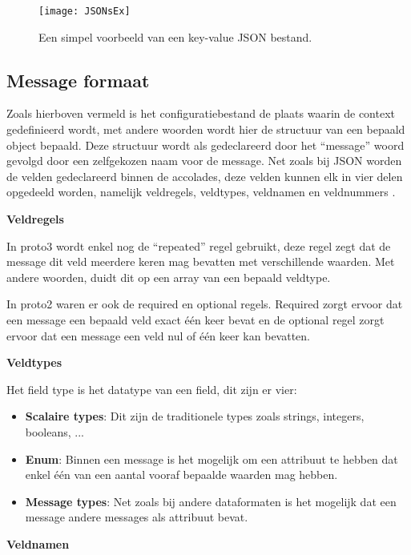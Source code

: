 \begin{figure}[H]
    \centering
    \texttt{[image: JSONsEx]}
    \caption[Simpel JSON key-value voorbeeld]{Een simpel voorbeeld van een key-value JSON bestand. \autocite{Kurian2020}}
    \label{fig:JSONsEx}
\end{figure}


\subsection{Message formaat}
\label{subsec:Message formaat}

Zoals hierboven vermeld is het configuratiebestand de plaats waarin de context gedefinieerd wordt, met andere woorden wordt hier de structuur van een bepaald object bepaald. Deze structuur wordt als gedeclareerd door het “message” woord gevolgd door een zelfgekozen naam voor de message. Net zoals bij JSON worden de velden gedeclareerd binnen de accolades, deze velden kunnen elk in vier delen opgedeeld worden, namelijk veldregels, veldtypes, veldnamen en veldnummers \autocite{Google2020}.

\textbf{Veldregels}

In proto3 wordt enkel nog de “repeated” regel gebruikt, deze regel zegt dat de message dit veld meerdere keren mag bevatten met verschillende waarden. Met andere woorden, duidt dit op een array van een bepaald veldtype.

In proto2 waren er ook de required en optional regels. Required zorgt ervoor dat een message een bepaald veld exact één keer bevat en de optional regel zorgt ervoor dat een message een veld nul of één keer kan bevatten.

\textbf{Veldtypes}

Het field type is het datatype van een field, dit zijn er vier:

\begin{itemize}
    \item \textbf{Scalaire types}: Dit zijn de traditionele types zoals strings, integers, booleans, ...
    \item \textbf{Enum}: Binnen een message is het mogelijk om een attribuut te hebben dat enkel één van een aantal vooraf bepaalde waarden mag hebben.
    \item \textbf{Message types}: Net zoals bij andere dataformaten is het mogelijk dat een message andere messages als attribuut bevat.
\end{itemize}

\textbf{Veldnamen}

